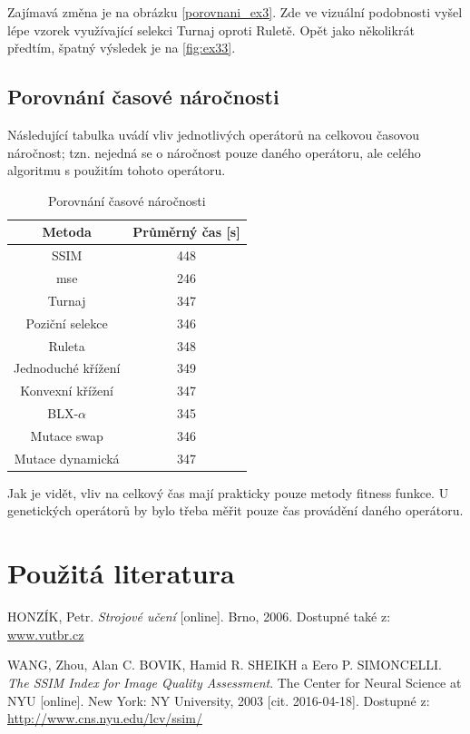 \documentclass[a4paper,11pt]{scrartcl}
\begin{document}
Zajímavá změna je na obrázku \ref{porovnani_ex3}. Zde ve vizuální podobnosti vyšel lépe vzorek využívající selekci Turnaj oproti Ruletě. Opět jako několikrát předtím, špatný výsledek je na \ref{fig:ex33}.


\subsection{Porovnání časové náročnosti}

Následující tabulka uvádí vliv jednotlivých operátorů na celkovou časovou náročnost; tzn. nejedná se o náročnost pouze daného operátoru, ale celého algoritmu s použitím tohoto operátoru.

\begin{table}[!h]
  \caption{Porovnání časové náročnosti}
  \label{tab:por}

  \begin{center}
    \begin{tabular}{|c|c|}
    \hline
       Metoda & Průměrný čas [s] \\
       \hline
       SSIM & 448 \\
        mse &
        246 \\
        Turnaj &
        347 \\
        Poziční selekce &
        346 \\
        Ruleta &
        348 \\
        Jednoduché křížení &
        349 \\
        Konvexní křížení &
        347 \\
        BLX-$\alpha$ &
        345 \\
        Mutace swap &
        346 \\
        Mutace dynamická &
        347 \\
        \hline
    \end{tabular}
  \end{center}
\end{table}

Jak je vidět, vliv na celkový čas mají prakticky pouze metody fitness funkce. U genetických operátorů by bylo třeba měřit pouze čas provádění daného operátoru.

\section{Použitá literatura}

\begin{thebibliography}{9}
 
HONZÍK, Petr. \emph{Strojové učení} [online]. Brno, 2006. Dostupné také z: \url{www.vutbr.cz}

WANG, Zhou, Alan C. BOVIK, Hamid R. SHEIKH a Eero P. SIMONCELLI. \emph{The SSIM Index for Image Quality Assessment}. The Center for Neural Science at NYU [online]. New York: NY University, 2003 [cit. 2016-04-18]. Dostupné z: \url{http://www.cns.nyu.edu/lcv/ssim/}

\end{thebibliography}
\end{document}
